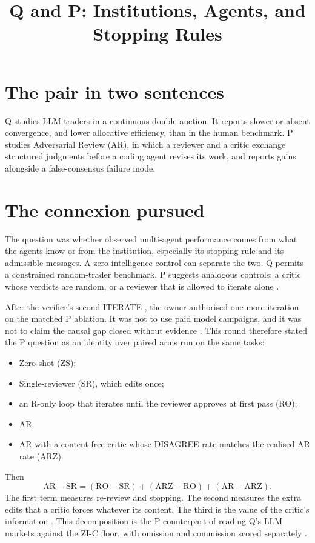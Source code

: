 \documentclass{article}
\title{Q and P: Institutions, Agents, and Stopping Rules}
\begin{document}
\maketitle

\section{The pair in two sentences}
Q studies LLM traders in a continuous double auction. It reports slower or absent convergence, and lower allocative efficiency, than in the human benchmark. P studies Adversarial Review (AR), in which a reviewer and a critic exchange structured judgments before a coding agent revises its work, and reports gains alongside a false-consensus failure mode.

\section{The connexion pursued}
The question was whether observed multi-agent performance comes from what the agents know or from the institution, especially its stopping rule and its admissible messages. A zero-intelligence control can separate the two. Q permits a constrained random-trader benchmark. P suggests analogous controls: a critic whose verdicts are random, or a reviewer that is allowed to iterate alone .

After the verifier's second ITERATE , the owner authorised one more iteration on the matched P ablation. It was not to use paid model campaigns, and it was not to claim the causal gap closed without evidence . This round therefore stated the P question as an identity over paired arms run on the same tasks:
\begin{itemize}
\item Zero-shot (ZS);
\item Single-reviewer (SR), which edits once;
\item an R-only loop that iterates until the reviewer approves at first pass (RO);
\item AR;
\item AR with a content-free critic whose DISAGREE rate matches the realised AR rate (ARZ).
\end{itemize}
Then
\[
  \mathrm{AR}-\mathrm{SR} = (\mathrm{RO}-\mathrm{SR}) + (\mathrm{ARZ}-\mathrm{RO}) + (\mathrm{AR}-\mathrm{ARZ}).
\]
The first term measures re-review and stopping. The second measures the extra edits that a critic forces whatever its content. The third is the value of the critic's information . This decomposition is the P counterpart of reading Q's LLM markets against the ZI-C floor, with omission and commission scored separately .
\end{document}
